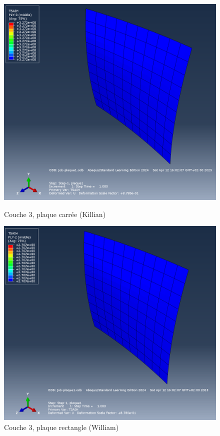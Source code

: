\documentclass[a4paper,12pt]{article}
\begin{document}
\clearpage

\begin{figure}[h!]
	\centering
	\begin{minipage}{0.495\textwidth}
		\centering
		\includegraphics[width=\textwidth]{media/K_P1_L3_12042025.png} %
		\caption{Couche 3, plaque carrée (Killian)}
		\label{fig:image1}
	\end{minipage}
	\hfill
	\begin{minipage}{0.495\textwidth}
		\centering
		\includegraphics[width=\textwidth]{media/K_P1_L2_12042025.png} %
		\caption{Couche 3, plaque rectangle (William)}
		\label{fig:image2}
	\end{minipage}
\end{figure}
\end{document}
